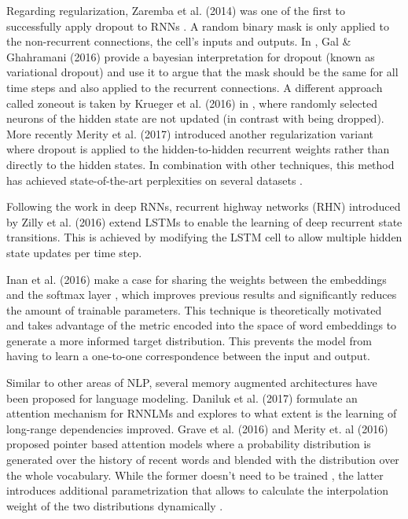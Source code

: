 Regarding regularization, Zaremba et al. (2014) was one of the first to successfully apply dropout to RNNs \cite{zaremba2014recurrent}. A random binary mask is only applied to the non-recurrent connections, the cell's inputs and outputs. In \cite{gal2016theoretically}, Gal \& Ghahramani (2016) provide a bayesian interpretation for dropout (known as variational dropout) and use it to argue that the mask should be the same for all time steps and also applied to the recurrent connections. A different approach called zoneout is taken by Krueger et al. (2016) in \cite{krueger2016zoneout}, where randomly selected neurons of the hidden state are not updated (in contrast with being dropped). More recently Merity et al. (2017) introduced another regularization variant where dropout is applied to the hidden-to-hidden recurrent weights rather than directly to the hidden states. In combination with other techniques, this method has achieved state-of-the-art perplexities on several datasets \cite{merity2017regularizing}.

Following the work in deep RNNs, recurrent highway networks (RHN) \cite{zilly2016recurrent} introduced by Zilly et al. (2016) extend LSTMs to enable the learning of deep recurrent state transitions. This is achieved by modifying the LSTM cell to allow multiple hidden state updates per time step.

Inan et al. (2016) make a case for sharing the weights between the embeddings and the softmax layer \cite{inan2016tying}, which improves previous results and significantly reduces the amount of trainable parameters. This technique is theoretically motivated and takes advantage of the metric encoded into the space of word embeddings to generate a more informed target distribution. This prevents the model from having to learn a one-to-one correspondence between the input and output.

Similar to other areas of NLP, several memory augmented architectures have been proposed for language modeling. Daniluk et al. (2017) formulate an attention mechanism for RNNLMs \cite{daniluk2017frustratingly} and explores to what extent is the learning of long-range dependencies improved. Grave et al. (2016) and Merity et. al (2016) proposed pointer based attention models where a probability distribution is generated over the history of recent words and blended with the distribution over the whole vocabulary. While the former doesn't need to be trained \cite{grave2016improving}, the latter introduces additional parametrization that allows to calculate the interpolation weight of the two distributions dynamically \cite{merity2016pointer}.

